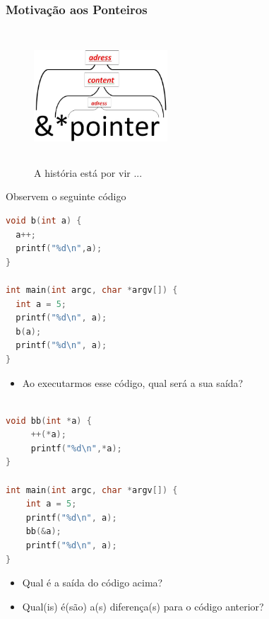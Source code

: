 \begin{frame}[allowframebreaks=0.9]

\frametitle{Motivação aos Ponteiros}
\begin{figure}[ht]
  \begin{center}

\includegraphics[height=5cm, width=5cm]{figs/fig_ponteiros/hierarq_pointer.png}

    \caption{A história está por vir ...}
  \end{center}
\end{figure}

\end{frame}

\begin{frame}{Observem o seguinte código}

\begin{lstlisting}[language=C]
void b(int a) {
  a++;
  printf("%d\n",a);
}

int main(int argc, char *argv[]) {
  int a = 5;
  printf("%d\n", a);
  b(a);
  printf("%d\n", a);
}

\end{lstlisting}

\pause

\begin{itemize}
  \item Ao executarmos esse código, qual será a sua saída?
\end{itemize}
\end{frame}

\begin{frame}[c,fragile]{}
\begin{lstlisting}[language=C]

void bb(int *a) {
     ++(*a);
     printf("%d\n",*a);
}

int main(int argc, char *argv[]) {
    int a = 5;
    printf("%d\n", a);
    bb(&a);
    printf("%d\n", a);
}
\end{lstlisting}

\pause
\begin{itemize}
  \item Qual é a saída do código acima? 
  \item Qual(is) é(são) a(s) diferença(s) para o código anterior?
\end{itemize}
\end{frame}

